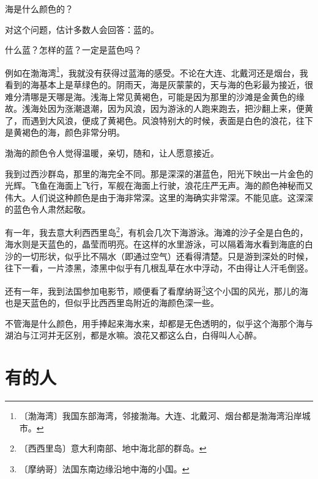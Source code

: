 \documentclass[12pt,UTF-8,openany]{ctexbook}
\begin{document}
\begin{Large}
    
    海是什么颜色的？
    
    对这个问题，估计多数人会回答：蓝的。
    
    什么蓝？怎样的蓝？一定是蓝色吗？
    
    例如在渤海湾\footnote{〔渤海湾〕我国东部海湾，邻接渤海。大连、北戴河、烟台都是渤海湾沿岸城市。}，我就没有获得过蓝海的感受。不论在大连、北戴河还是烟台，我看到的海基本上是草绿色的。阴雨天，海是灰蒙蒙的，天与海的色彩最为接近，很难分清哪是天哪是海。浅海上常见黄褐色，可能是因为那里的沙滩是金黄色的缘故。浅海处因为涨潮退潮，因为风浪，因为游泳的人跑来跑去，把沙翻上来，便黄了，而遇到大风浪，便成了黄褐色。风浪特别大的时候，表面是白色的浪花，往下是黄褐色的海，颜色非常分明。
    
    渤海的颜色令人觉得温暖，亲切，随和，让人愿意接近。
    
    我到过西沙群岛，那里的海完全不同。那是深深的湛蓝色，阳光下映出一片金色的光辉。飞鱼在海面上飞行，军舰在海面上行驶，浪花庄严无声。海的颜色神秘而又伟大。人们说这种颜色是由于海非常深。这里的海确实非常深。不能见底。这深深的蓝色令人肃然起敬。
    
    有一年，我去意大利西西里岛\footnote{〔西西里岛〕意大利南部、地中海北部的群岛。}，有机会几次下海游泳。海滩的沙子全是白色的，海水则是天蓝色的，晶莹而明亮。在这样的水里游泳，可以隔着海水看到海底的白沙的一切形状，似乎比不隔水（即通过空气）还看得清楚。只是游到深处的时候，往下一看，一片漆黑，漆黑中似乎有几根乱草在水中浮动，不由得让人汗毛倒竖。
    
    还有一年，我到法国参加电影节，顺便看了看摩纳哥\footnote{〔摩纳哥〕法国东南边缘沿地中海的小国。}这个小国的风光，那儿的海也是天蓝色的，但似乎比西西里岛附近的海颜色深一些。
    
    不管海是什么颜色，用手捧起来海水来，却都是无色透明的，似乎这个海那个海与湖泊与江河并无区别，都是水嘛。浪花又都这么白，白得叫人心醉。
    
\end{Large}

\chapter{有的人}
\end{document}
